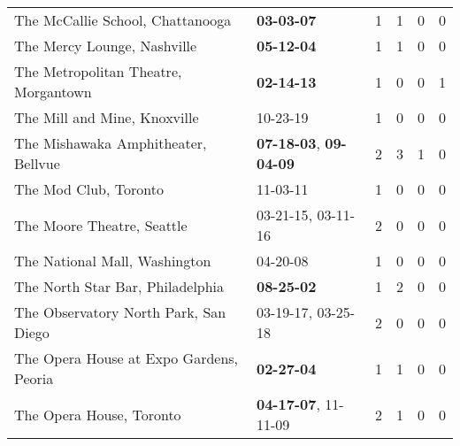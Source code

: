 \begin{longtable}{p{}p{}p{}p{}p{}p{}}
                                             The McCallie School, Chattanooga &                                       \textbf{03-03-07\textsuperscript{}} &  1 &  1 &  0 &  0 \\
                                                  The Mercy Lounge, Nashville &                                       \textbf{05-12-04\textsuperscript{}} &  1 &  1 &  0 &  0 \\
                                         The Metropolitan Theatre, Morgantown &                                       \textbf{02-14-13\textsuperscript{}} &  1 &  0 &  0 &  1 \\
                                                 The Mill and Mine, Knoxville &                                                10-23-19\textsuperscript{} &  1 &  0 &  0 &  0 \\
                                          The Mishawaka Amphitheater, Bellvue &  \textbf{07-18-03\textsuperscript{}}, \textbf{09-04-09\textsuperscript{}} &  2 &  3 &  1 &  0 \\
                                                        The Mod Club, Toronto &                                                11-03-11\textsuperscript{} &  1 &  0 &  0 &  0 \\
                                                   The Moore Theatre, Seattle &                    03-21-15\textsuperscript{}, 03-11-16\textsuperscript{} &  2 &  0 &  0 &  0 \\
                                                The National Mall, Washington &                                                04-20-08\textsuperscript{} &  1 &  0 &  0 &  0 \\
                                             The North Star Bar, Philadelphia &                                       \textbf{08-25-02\textsuperscript{}} &  1 &  2 &  0 &  0 \\
                                        The Observatory North Park, San Diego &                    03-19-17\textsuperscript{}, 03-25-18\textsuperscript{} &  2 &  0 &  0 &  0 \\
                                      The Opera House at Expo Gardens, Peoria &                                       \textbf{02-27-04\textsuperscript{}} &  1 &  1 &  0 &  0 \\
                                                     The Opera House, Toronto &           \textbf{04-17-07\textsuperscript{}}, 11-11-09\textsuperscript{} &  2 &  1 &  0 &  0 \\

\end{longtable}
